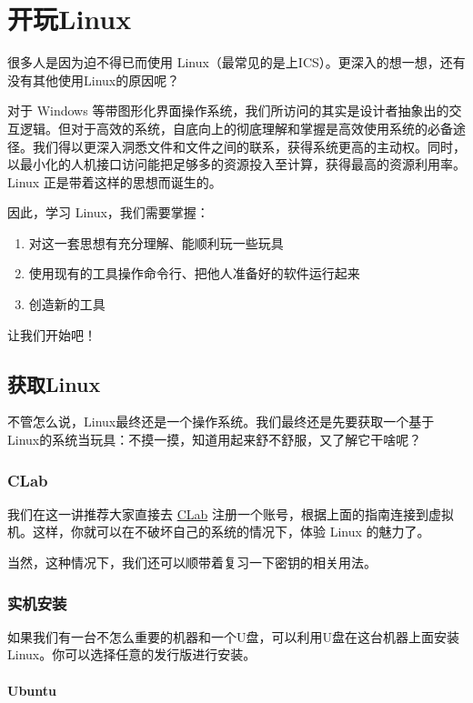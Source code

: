 \documentclass[../main.tex]{subfiles}
\begin{document}
\chapter{开玩Linux}\label{chap:play-with-linux}

很多人是因为迫不得已而使用 Linux（最常见的是上ICS）。更深入的想一想，还有没有其他使用Linux的原因呢？

对于 Windows 等带图形化界面操作系统，我们所访问的其实是设计者抽象出的交互逻辑。但对于高效的系统，自底向上的彻底理解和掌握是高效使用系统的必备途径。我们得以更深入洞悉文件和文件之间的联系，获得系统更高的主动权。同时，以最小化的人机接口访问能把足够多的资源投入至计算，获得最高的资源利用率。Linux 正是带着这样的思想而诞生的。

因此，学习 Linux，我们需要掌握：

\begin{enumerate}
    \item 对这一套思想有充分理解、能顺利玩一些玩具
    \item 使用现有的工具操作命令行、把他人准备好的软件运行起来
    \item 创造新的工具
\end{enumerate}

让我们开始吧！

\section{获取Linux}

不管怎么说，Linux最终还是一个操作系统。我们最终还是先要获取一个基于Linux的系统当玩具：不摸一摸，知道用起来舒不舒服，又了解它干啥呢？

\subsection{CLab}

我们在这一讲推荐大家直接去 \href{https://clab.pku.edu.cn/}{CLab} 注册一个账号，根据上面的指南连接到虚拟机。这样，你就可以在不破坏自己的系统的情况下，体验 Linux 的魅力了。

当然，这种情况下，我们还可以顺带着复习一下密钥的相关用法。

\subsection{实机安装}

如果我们有一台不怎么重要的机器和一个U盘，可以利用U盘在这台机器上面安装Linux。你可以选择任意的发行版进行安装。

\subsubsection{Ubuntu}
\end{document}
